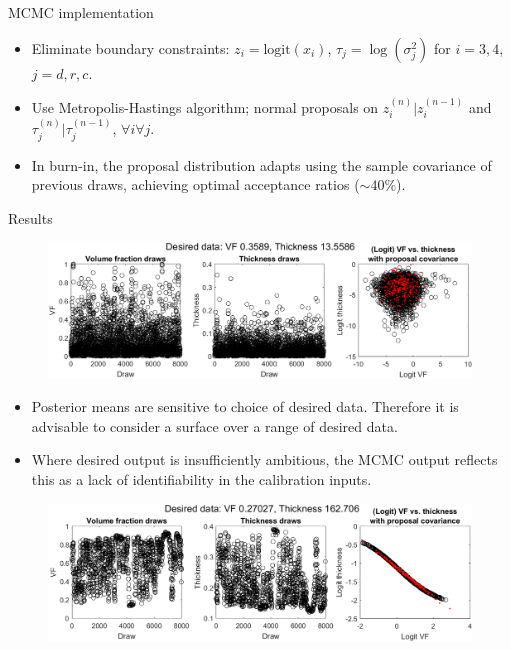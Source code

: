 \documentclass[final]{beamer}
\newlength{\onecolwid}
\begin{document}
\begin{frame}[t]
\begin{columns}[t]
\begin{column}{\onecolwid}
\begin{alertblock}{MCMC implementation}
\begin{itemize}
\item Eliminate boundary constraints: $z_i = \mathrm{logit}(x_i)$, $\tau_j = \log(\sigma^2_j)$ for $i=3,4$, $j=d,r,c$.

\item Use Metropolis-Hastings %
algorithm; normal proposals on $z_i^{(n)}|z_i^{(n-1)}$ and $\tau_j^{(n)}|\tau_j^{(n-1)}$, $\forall i \forall j$.

\item In burn-in, the proposal distribution adapts using the sample covariance of previous draws, achieving optimal acceptance ratios ($\sim40\%$).

\end{itemize}



\end{alertblock}


\begin{alertblock}{Results}

\begin{figure}[h!]
\includegraphics[width=\linewidth]{FIG1}
\label{res}
\end{figure}

\vspace{-30mm}
\begin{itemize}
\item Posterior means are sensitive to choice of desired data. Therefore it is advisable to consider a surface over a range of desired data.
\item Where desired output is insufficiently ambitious, the MCMC output reflects this as a lack of identifiability in the calibration inputs.
\end{itemize}

\vspace{-10mm}
\begin{figure}[h!]
\includegraphics[width=\linewidth]{FIG2}
\label{unident}
\end{figure}


\end{alertblock}
\end{column}
\end{columns}
\end{frame}
\end{document}
